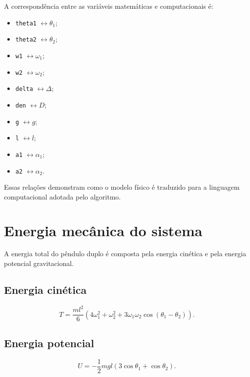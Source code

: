 \documentclass[12pt,a4paper]{article}
\begin{document}
A correspondência entre as variáveis matemáticas e computacionais é:

\begin{itemize}
    \item \texttt{theta1} $\leftrightarrow \theta_1$;
    \item \texttt{theta2} $\leftrightarrow \theta_2$;
    \item \texttt{w1} $\leftrightarrow \omega_1$;
    \item \texttt{w2} $\leftrightarrow \omega_2$;
    \item \texttt{delta} $\leftrightarrow \Delta$;
    \item \texttt{den} $\leftrightarrow D$;
    \item \texttt{g} $\leftrightarrow g$;
    \item \texttt{l} $\leftrightarrow l$;
    \item \texttt{a1} $\leftrightarrow \alpha_1$;
    \item \texttt{a2} $\leftrightarrow \alpha_2$.
\end{itemize}

Essas relações demonstram como o modelo físico é traduzido para a linguagem computacional adotada pelo algoritmo.

\section{Energia mecânica do sistema}

A energia total do pêndulo duplo é composta pela energia cinética e pela energia potencial gravitacional.

\subsection{Energia cinética}

\begin{equation}
T = \frac{m l^2}{6}\left(4\omega_1^2+\omega_2^2
+3\omega_1\omega_2\cos(\theta_1-\theta_2)\right).
\end{equation}

\subsection{Energia potencial}

\begin{equation}
U = -\frac{1}{2}mgl\left(3\cos\theta_1+\cos\theta_2\right).
\end{equation}
\end{document}
